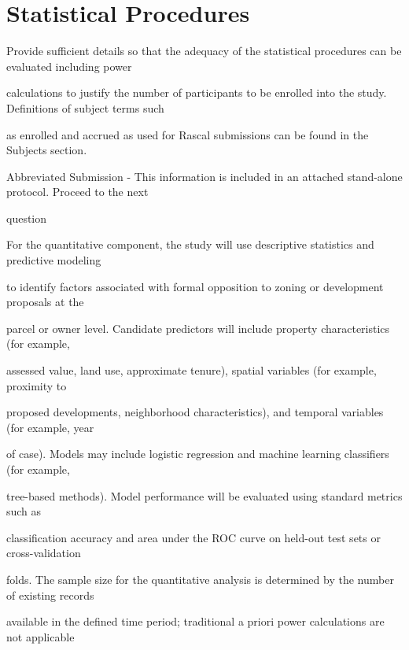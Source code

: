 \documentclass[10pt, letterpaper]{article}
\begin{document}
\vspace{0.5em}

\section*{Statistical Procedures}

Provide sufficient details so that the adequacy of the statistical procedures can be evaluated including power

calculations to justify the number of participants to be enrolled into the study. Definitions of subject terms such

as enrolled and accrued as used for Rascal submissions can be found in the Subjects section.

\noindent \makebox[0pt][l]{$\square$}\hspace{1.2em} Abbreviated Submission - This information is included in an attached stand-alone protocol. Proceed to the next

question

\begin{responsebox}

For the quantitative component, the study will use descriptive statistics and predictive modeling

\end{responsebox}

to identify factors associated with formal opposition to zoning or development proposals at the

parcel or owner level. Candidate predictors will include property characteristics (for example,

assessed value, land use, approximate tenure), spatial variables (for example, proximity to

proposed developments, neighborhood characteristics), and temporal variables (for example, year

of case). Models may include logistic regression and machine learning classifiers (for example,

tree-based methods). Model performance will be evaluated using standard metrics such as

classification accuracy and area under the ROC curve on held-out test sets or cross-validation

folds. The sample size for the quantitative analysis is determined by the number of existing records

available in the defined time period; traditional a priori power calculations are not applicable
\end{document}
